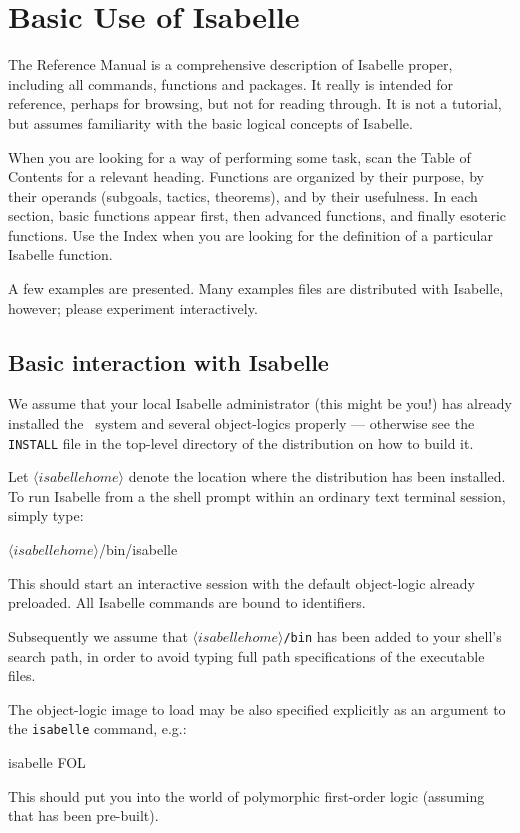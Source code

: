 
\chapter{Basic Use of Isabelle} 
The Reference Manual is a comprehensive description of Isabelle
proper, including all \ML{} commands, functions and packages.  It
really is intended for reference, perhaps for browsing, but not for
reading through.  It is not a tutorial, but assumes familiarity with
the basic logical concepts of Isabelle.

When you are looking for a way of performing some task, scan the Table of
Contents for a relevant heading.  Functions are organized by their purpose,
by their operands (subgoals, tactics, theorems), and by their usefulness.
In each section, basic functions appear first, then advanced functions, and
finally esoteric functions.  Use the Index when you are looking for the
definition of a particular Isabelle function.

A few examples are presented.  Many examples files are distributed with
Isabelle, however; please experiment interactively.


\section{Basic interaction with Isabelle}
\nobreak
%
We assume that your local Isabelle administrator (this might be you!)
has already installed the \Pure\ system and several object-logics
properly --- otherwise see the {\tt INSTALL} file in the top-level
directory of the distribution on how to build it.

\medskip Let $\langle isabellehome \rangle$ denote the location where
the distribution has been installed. To run Isabelle from a the shell
prompt within an ordinary text terminal session, simply type:
\begin{ttbox}
\({\langle}isabellehome{\rangle}\)/bin/isabelle
\end{ttbox}
This should start an interactive \ML{} session with the default
object-logic already preloaded. All Isabelle commands are bound to
\ML{} identifiers.

Subsequently we assume that {\tt \(\langle isabellehome \rangle\)/bin}
has been added to your shell's search path, in order to avoid typing
full path specifications of the executable files.

The object-logic image to load may be also specified explicitly as an
argument to the {\tt isabelle} command, e.g.:
\begin{ttbox}
isabelle FOL
\end{ttbox}
This should put you into the world of polymorphic first-order logic
(assuming that {\FOL} has been pre-built).

